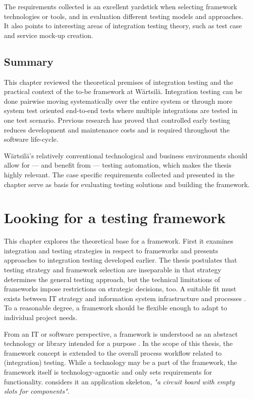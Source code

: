 \documentclass[12pt,a4paper,oneside,pdftex]{report}
\begin{document}
The requirements collected is an excellent yardstick when selecting framework technologies or tools, and in evaluation different testing models and approaches. It also points to interesting areas of integration testing theory, such as test case and service mock-up creation.

\section{Summary}

This chapter reviewed the theoretical premises of integration testing and the practical context of the to-be framework at Wärtsilä. Integration testing can be done pairwise moving systematically over the entire system or through more system test oriented end-to-end tests where multiple integrations are tested in one test scenario. Previous research has proved that controlled early testing reduces development and maintenance costs and is required throughout the software life-cycle. %

Wärtsilä's relatively conventional technological and business environments should allow for --- and benefit from --- testing automation, which makes the thesis highly relevant. The case specific requirements collected and presented in the chapter serve as basis for evaluating testing solutions and building the framework.

\chapter{Looking for a testing framework}
\label{chapter:frameworktheory}

This chapter explores the theoretical base for a framework. First it examines integration and testing strategies in respect to frameworks and presents approaches to integration testing developed earlier. The thesis postulates that testing strategy and framework selection are inseparable in that strategy determines the general testing approach, but the technical limitations of frameworks impose restrictions on strategic decisions, too. A suitable fit must exists between IT strategy and information system infrastructure and processes \citep{henderson1993strategic}. To a reasonable degree, a framework should be flexible enough to adapt to individual project needs.


From an IT or software perspective, a framework is understood as an abstract technology or library intended for a purpose \citep{johnson1988designing}. In the scope of this thesis, the framework concept is extended to the overall process workflow related to (integration) testing. While a technology may be a part of the framework, the framework itself is technology-agnostic and only sets requirements for functionality. \citet{pezze2008software} considers it an application skeleton, \textit{"a circuit board with empty slots for components"}. 
\end{document}
